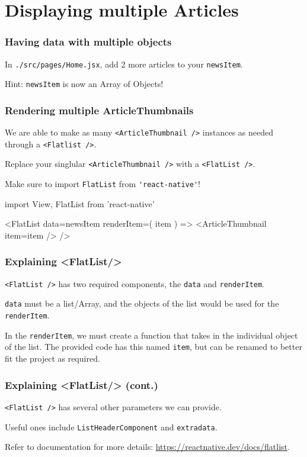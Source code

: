 \documentclass{beamer}
\begin{document}
  \section{Displaying multiple Articles}
  \begin{frame}[fragile]
    \frametitle{Having data with multiple objects}
    In \verb|./src/pages/Home.jsx|, add 2 more articles to your \verb|newsItem|.
    
    Hint: \verb|newsItem| is now an Array of Objects!
  \end{frame}
  \begin{frame}[fragile]
    \frametitle{Rendering multiple ArticleThumbnails}
    We are able to make as many \verb|<ArticleThumbnail />| instances as needed through a \verb|<Flatlist />|. 

    Replace your singlular \verb|<ArticleThumbnail />| with a \verb|<FlatList />|. 

    Make sure to import \verb|FlatList| from \verb|'react-native'|!

    \begin{jscodesmall}
import {View, FlatList} from 'react-native'

<FlatList
  data={newsItem}
  renderItem={({ item }) => <ArticleThumbnail item={item} />}
/>
    \end{jscodesmall}
  \end{frame}

  \begin{frame}[fragile]
    \frametitle{Explaining <FlatList/>}
    \verb|<FlatList />| has two required components, the \verb|data| and \verb|renderItem|. 

    \verb|data| must be a list/Array, and the objects of the list would be used for the \verb|renderItem|.

    In the \verb|renderItem|, we must create a function that takes in the individual object of the list.
    The provided code has this named \verb|item|, but can be renamed to better fit the project as required. 
  \end{frame}
  \begin{frame}[fragile]
    \frametitle{Explaining <FlatList/> (cont.)}
    \verb|<FlatList />| has several other parameters we can provide. 

    Useful ones include \verb|ListHeaderComponent| and \verb|extradata|. 

    Refer to documentation for more details: \url{https://reactnative.dev/docs/flatlist}.

  \end{frame}
\end{document}
